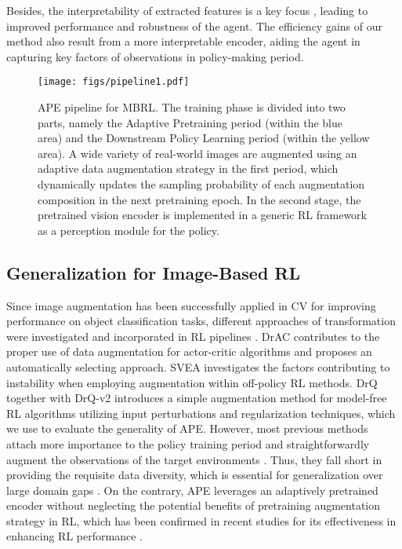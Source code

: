 Besides, the interpretability of extracted features is a key focus \cite{Lin2020SPACEUO, Delfosse2022BoostingOR, Delfosse2024InterpretableCB}, leading to improved performance and robustness of the agent. The efficiency gains of our method also result from a more interpretable encoder, aiding the agent in capturing key factors of observations in policy-making period.

\begin{figure*}[t]
\centering
\texttt{[image: figs/pipeline1.pdf]} %
\caption{APE pipeline for MBRL. The training phase is divided into two parts, namely the Adaptive Pretraining period (within the 
blue area) and the Downstream Policy Learning period (within the 
yellow area). A wide variety of real-world images are augmented using an adaptive data augmentation strategy in the first period, which dynamically updates the sampling probability of each augmentation composition in the next pretraining epoch. In the second stage, the pretrained vision encoder is implemented in a generic RL framework as a perception module for the policy.}
\label{fig1}
\end{figure*}

\subsection{Generalization for Image-Based RL}
Since image augmentation has been successfully applied in CV for improving performance on object classification tasks, different approaches of transformation were investigated and incorporated in RL pipelines \cite{Laskin2020ReinforcementLW, Kostrikov2020ImageAI, Stooke2020DecouplingRL}. 
DrAC \cite{Raileanu2021AutomaticDA} contributes to the proper use of data augmentation for actor-critic algorithms and proposes an automatically selecting approach. 
SVEA \cite{Hansen2021StabilizingDQ} investigates the factors contributing to instability when employing augmentation within off-policy RL methods. DrQ \cite{Kostrikov2020ImageAI} together with DrQ-v2 \cite{Yarats2021MasteringVC} introduces a simple augmentation method for model-free RL algorithms utilizing input perturbations and regularization techniques, which we use to evaluate the generality of APE.
However, most previous methods attach more importance to the policy training period and straightforwardly augment the observations of the target environments \cite{Zhao2024AnEG}. Thus, they fall short in providing the requisite data diversity, which is essential for generalization over large domain gaps \cite{Yuan2022PreTrainedIE}. 
On the contrary, APE leverages an adaptively pretrained encoder without neglecting the potential benefits of pretraining augmentation strategy in RL, which has been confirmed in recent studies for its effectiveness in enhancing RL performance \cite{Burns2023WhatMP}.

